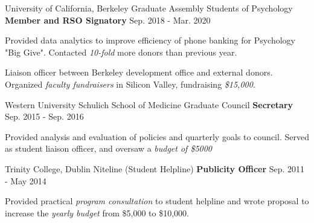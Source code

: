 

\begin{cventries}

  \cventry 
    {University of California, Berkeley} %
    {Graduate Assembly Students of Psychology}
    {\textbf{Member and RSO Signatory}} %
    {Sep. 2018 - Mar. 2020} %
    {
      \begin{cvitems} %
        \item {Provided data analytics to improve efficiency of phone banking for Psychology "Big Give". Contacted \textit{10-fold} more donors than previous year.}
        \item {Liaison officer between Berkeley development office and external donors. Organized \textit{faculty fundraisers} in Silicon Valley, fundraising \textit{\$15,000}.}
      \end{cvitems}
    }
    
  \cventry
  	{Western University} %
  	{Schulich School of Medicine Graduate Council} %
    {\textbf{Secretary}} %
    {Sep. 2015 - Sep. 2016} %
    {
      \begin{cvitems} %
        \item {Provided analysis and evaluation of policies and quarterly goals to council. Served as student liaison officer, and oversaw a \textit{budget of \$5000}}
      \end{cvitems}
    }
    
  \cventry
  	{Trinity College, Dublin}
  	{Niteline (Student Helpline)} %
    {\textbf{Publicity Officer}} %
    {Sep. 2011 - May 2014} %
    {
      \begin{cvitems} %
        \item {Provided practical \textit{program consultation} to student helpline and wrote proposal to increase the \textit{yearly budget} from \$5,000 to \$10,000.}
      \end{cvitems}
    }
    

\end{cventries}
